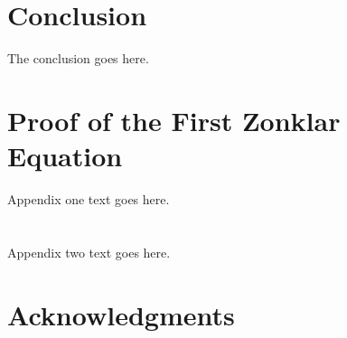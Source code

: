 \documentclass[10pt,journal,letterpaper,compsoc]{IEEEtran}
\begin{document}
\section{Conclusion}
The conclusion goes here.






%


\appendices
\section{Proof of the First Zonklar Equation}
Appendix one text goes here.

\section{}
Appendix two text goes here.


\ifCLASSOPTIONcompsoc
  \section*{Acknowledgments}
\else
\end{document}
